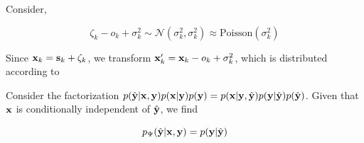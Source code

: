 \documentclass{article}
\begin{document}
Consider,

\begin{equation}
\zeta_{k} - o_{k} + \sigma_{k}^{2} \sim \mathcal{N}(\sigma_{k}^{2},\sigma_{k}^{2}) \approx \mathrm{Poisson}(\sigma_{k}^{2})
\end{equation}

Since $\bold{x}_{k} = \bold{s}_{k} + \zeta_{k}$, we transform $\bold{x}_{k}' = \bold{x}_{k} - o_{k} + \sigma_{k}^{2}$, which is distributed according to 

Consider the factorization $p(\hat{\bold{y}}|\bold{x},\bold{y})p(\bold{x}|\bold{y})p(\bold{y})=p(\bold{x}|\bold{y},\hat{\bold{y}})p(\bold{y}|\hat{\bold{y}})p(\hat{\bold{y}})$. Given that $\bold{x}$ is conditionally independent of $\hat{\bold{y}}$, we find

\begin{equation*}
p_{\Psi}(\hat{\bold{y}}|\bold{x},\bold{y})=p(\bold{y}|\hat{\bold{y}})
\end{equation*}
\end{document}
